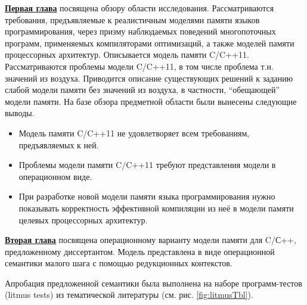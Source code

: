 \underline{\textbf{Первая глава}} посвящена обзору области исследования.
Рассматриваются требования, предъявляемые к реалистичным моделями памяти
языков программирования, через призму наблюдаемых поведений многопоточных программ,
применяемых компиляторами оптимизаций, а также моделей памяти процессорных архитектур.
Описывается модель памяти C/C++11. Рассматриваются проблемы модели C/C++11, в том числе
проблема т.н. значений из воздуха. Приводится описание существующих решений к заданию
слабой модели памяти без значений из воздуха, в частности, ``обещающей'' модели памяти.
На базе обзора предметной области были вынесены следующие выводы.
\begin{itemize}
  \item Модель памяти C/C++11 не удовлетворяет всем требованиям, предъявляемых к ней.
  \item Проблемы модели памяти C/C++11 требуют представления модели в операционном виде.
  \item При разработке новой модели памяти языка программирования нужно показывать корректность эффективной компиляции
    из неё в модели памяти целевых процессорных архитектур.
\end{itemize}

\underline{\textbf{Вторая глава}} посвящена операционному варианту модели памяти для C/С++,
предложенному диссертантом. Модель представлена в виде операционной семантики малого шага с помощью редукционных
контекстов.


Апробация предложенной семантики была выполнена на наборе программ-тестов (litmus tests) из тематической литературы
(см. рис. \ref{fig:litmusTbl}). 

